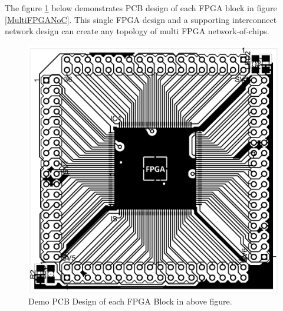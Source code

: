 The figure \ref{BasicPCB} below demonstrates PCB design of each FPGA block in figure \ref{MultiFPGANoC}. This single FPGA design and a supporting interconnect network design can create any topology of multi FPGA network-of-chips.
\begin{figure} [H]
  \centering
   \includegraphics[scale=1.3]{./figs/BasicPCB}
  \caption{Demo PCB Design of each FPGA Block in above figure.}
  \label{BasicPCB}
\end{figure}

